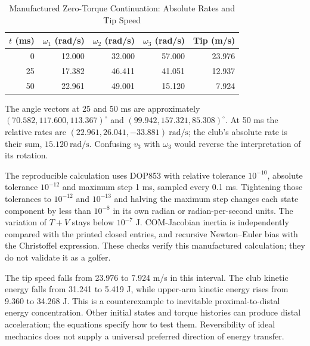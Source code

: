 \begin{table}[H]
\centering
\caption{Manufactured Zero-Torque Continuation: Absolute Rates and Tip Speed}
\begin{tabular}{rrrrr}
\toprule
$t$ (ms) & $\omega_1$ (rad/s) & $\omega_2$ (rad/s) & $\omega_3$ (rad/s) & Tip (m/s) \\
\midrule
0 & 12.000 & 32.000 & 57.000 & 23.976 \\
25 & 17.382 & 46.411 & 41.051 & 12.937 \\
50 & 22.961 & 49.001 & 15.120 & 7.924 \\
\bottomrule
\end{tabular}
\end{table}


The angle vectors at 25 and 50 ms are approximately $(70.582,117.600,113.367)^\circ$ and $(99.942,157.321,85.308)^\circ$. At 50 ms the relative rates are $(22.961,26.041,-33.881)\ \mathrm{rad/s}$; the club's absolute rate is their sum, $15.120\ \mathrm{rad/s}$. Confusing $v_3$ with $\omega_3$ would reverse the interpretation of its rotation.

The reproducible calculation uses DOP853 with relative tolerance $10^{-10}$, absolute tolerance $10^{-12}$ and maximum step 1 ms, sampled every 0.1 ms. Tightening those tolerances to $10^{-12}$ and $10^{-13}$ and halving the maximum step changes each state component by less than $10^{-8}$ in its own radian or radian-per-second units. The variation of $T+V$ stays below $10^{-7}$ J. COM-Jacobian inertia is independently compared with the printed closed entries, and recursive Newton--Euler bias with the Christoffel expression. These checks verify this manufactured calculation; they do not validate it as a golfer.

The tip speed falls from 23.976 to 7.924 m/s in this interval. The club kinetic energy falls from 31.241 to 5.419 J, while upper-arm kinetic energy rises from 9.360 to 34.268 J. This is a counterexample to inevitable proximal-to-distal energy concentration. Other initial states and torque histories can produce distal acceleration; the equations specify how to test them. Reversibility of ideal mechanics does not supply a universal preferred direction of energy transfer.


